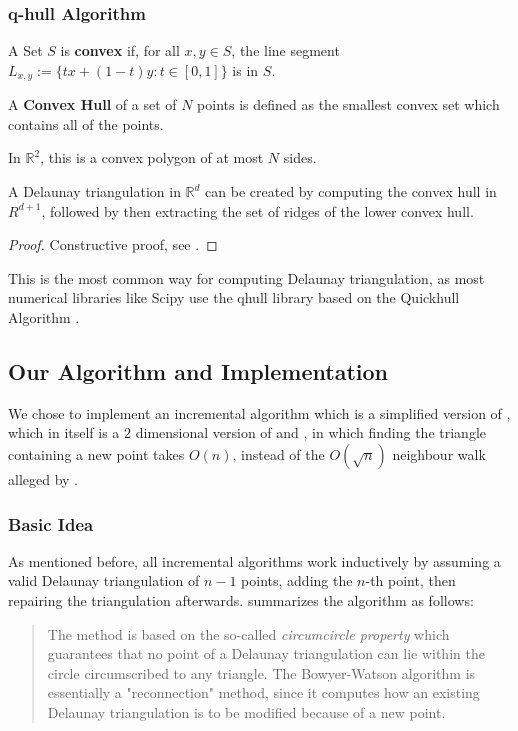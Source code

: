 \subsubsection{q-hull Algorithm}
\begin{definition}
A Set $S$ is \textbf{convex} if, for all $x,y \in S$, the line segment $L_{x,y} := \{ tx+(1-t)y : t \in [0,1] \}$ is in $S$.
\end{definition}
\begin{definition}
A \textbf{Convex Hull} of a set of $N$ points is defined as the smallest convex set which contains all of the points.
\end{definition}
In $\mathbb{R}^2$, this is a convex polygon of at most $N$ sides.\\
\begin{theorem}
A Delaunay triangulation in $\mathbb{R}^d$ can be created by computing the convex hull in $R^{d+1}$, followed by then extracting the set of ridges of the lower convex hull.
\end{theorem}
\begin{proof}
Constructive proof, see \cite{Brown1979}.
\end{proof}
This is the most common way for computing Delaunay triangulation, as most numerical libraries like Scipy \cite{Scipy2022} use the qhull library \cite{QHull} based on the Quickhull Algorithm \cite{Barber1996}.
\subsection{Our Algorithm and Implementation}
We chose to implement an incremental algorithm which is a simplified version of \cite{Green1978}, which in itself is a $2$ dimensional version of \cite{Bowyer1981} and \cite{Watson1981}, in which finding the triangle containing a new point takes $O(n)$, instead of the $O(\sqrt{n})$ neighbour walk alleged by \cite{Bowyer1981}.
\subsubsection{Basic Idea}
As mentioned before, all incremental algorithms work inductively by assuming a valid Delaunay triangulation of $n-1$ points, adding the $n$-th point, then repairing the triangulation afterwards.
\newpage
\cite{Rebay1993} summarizes the algorithm as follows:
\begin{quote}
    The method is based on the so-called \textit{circumcircle property} which guarantees that no point of a Delaunay triangulation can lie within the circle circumscribed to any triangle. The Bowyer-Watson algorithm is essentially a "reconnection" method, since it computes how an existing Delaunay triangulation is to be modified because of a new point.
\end{quote}
